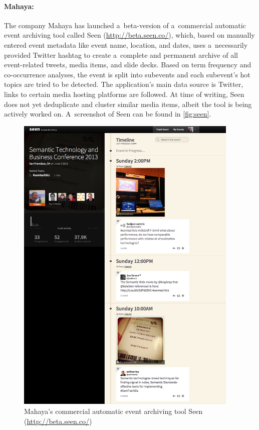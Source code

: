 \paragraph{Mahaya:}

The company Mahaya has launched a~beta-version
of a~commercial automatic event archiving tool called Seen
(\url{http://beta.seen.co/}),
which, based on manually entered event metadata like event name,
location, and dates, uses a~necessarily provided Twitter hashtag
to create a~complete and permanent archive of all event-related tweets,
media items, and slide decks.
Based on term frequency and co-occurrence analyses,
the event is split into subevents
and each subevent's hot topics are tried to be detected.
The application's main data source is Twitter,
links to certain media hosting platforms are followed.
At time of writing, Seen does not yet deduplicate and cluster
similar media items,
albeit the tool is being actively worked on.
A~screenshot of Seen can be found in \autoref{fig:seen}.

\begin{figure}
  \centering
  \includegraphics[width=0.95\textwidth,height=0.9\textheight,keepaspectratio]{seen.png}
  \caption[Mahaya's commercial automatic event archiving tool Seen]{Mahaya's commercial automatic event archiving tool Seen
    (\url{http://beta.seen.co/})}
  \label{fig:seen}
\end{figure}

